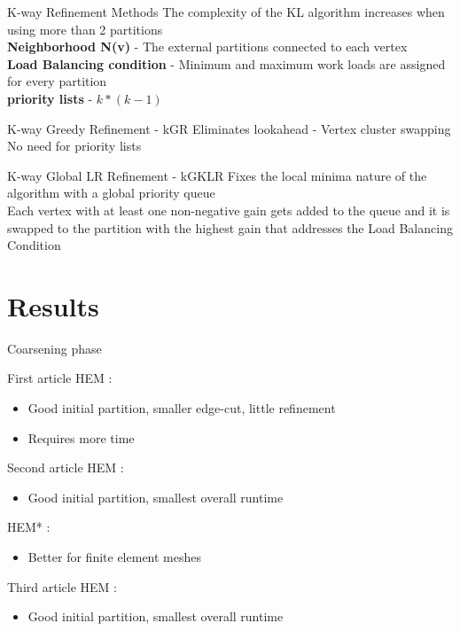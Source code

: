 \documentclass{beamer}
\begin{document}
\begin{frame}{K-way Refinement Methods}
	The complexity of the KL algorithm increases when using more than 2 partitions \\
	\textbf{Neighborhood N(v)} - The external partitions connected to each vertex\\
	\textbf{Load Balancing condition} - Minimum and maximum work loads are assigned for every partition\\
	\textbf{priority lists} - \(k*(k-1)\) 
	\begin{block}{K-way Greedy Refinement - kGR}
		Eliminates lookahead - Vertex cluster swapping\\
		No need for priority lists
	\end{block}
	\begin{block}{K-way Global LR Refinement - kGKLR}
		Fixes the local minima nature of the algorithm with a global priority queue\\
		Each vertex with at least one non-negative gain gets added to the queue and it is swapped to the partition with
		the highest gain that addresses the Load Balancing Condition 
	\end{block}
\end{frame}
\author[Q.~Diaferia]{Q.~Diaferia \and T.~Levasseur \and W.~Pei \and G.~Perez Bada}
\section{Results}

\begin{frame}{Coarsening phase}
	\begin{block}{First article}
		HEM :
		\begin{itemize}
			\item Good initial partition, smaller edge-cut, little refinement
			\item Requires more time
		\end{itemize}
	\end{block}
	\begin{block}{Second article}
		HEM :
		\begin{itemize}
			\item Good initial partition, smallest overall runtime
		\end{itemize}
		HEM* :
		\begin{itemize}
			\item Better for finite element meshes
		\end{itemize}
	\end{block}
	\begin{block}{Third article}
		HEM :
		\begin{itemize}
			\item Good initial partition, smallest overall runtime
		\end{itemize}
	\end{block}
\end{frame}
\end{document}
